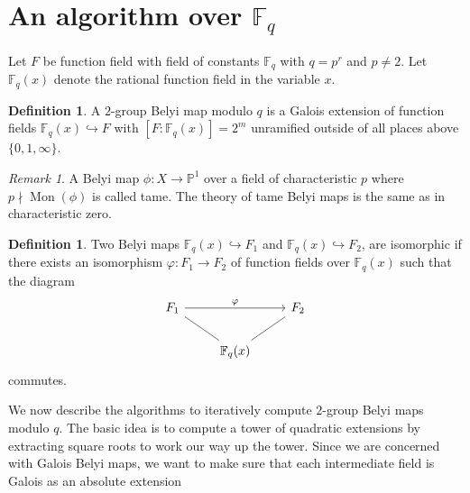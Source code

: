 \documentclass{dcthesis}
\newcommand{\PP}{\mathbb P}
\newcommand{\defi}[1]{\textsf{#1}}
\newcommand{\mm}[1]{{\color{blue} \sf MM: [#1]}}
\newcommand{\FF}{\mathbb{F}}
\DeclareMathOperator{\Mon}{Mon}
\numberwithin{equation}{section}
\theoremstyle{definition}
\newtheorem{definition}[equation]{Definition}
\theoremstyle{remark}
\newtheorem{remark}[equation]{Remark}
\begin{document}
{{  \section{An algorithm over $\FF_q$}{
    \label{sec:functionfieldalgorithm}
    Let $F$ be function field
    with field of constants
    $\FF_q$ with $q=p^r$ and $p\neq 2$.
    Let $\FF_q(x)$ denote the rational
    function field in the variable $x$.
    \begin{definition}
      \label{def:pgroupbelyimapmodq}
      A \defi{$2$-group Belyi map modulo $q$}
      is a Galois extension of
      function fields
      $\FF_q(x)\hookrightarrow F$ with
      $[F:\FF_q(x)]=2^m$
      unramified outside of
      all places above $\{0,1,\infty\}$.
    \end{definition}
    \begin{remark}
      \label{rmk:tamebelyi}
      A Belyi map
      $\phi\colon X\to\PP^1$ over a
      field of characteristic $p$
      where $p\nmid\Mon(\phi)$
      is called \defi{tame}.
      The theory of tame Belyi maps is
      the same as in characteristic zero.
    \end{remark}
    \begin{definition}\label{def:belyiisomodq}
      Two Belyi maps
      $\FF_q(x)\hookrightarrow F_1$ and
      $\FF_q(x)\hookrightarrow F_2$,
      are \defi{isomorphic}
      if there exists an isomorphism
      $\varphi\colon F_1\to F_2$
      of function fields over
      $\FF_q(x)$
      such that the diagram
      \begin{equation}
        \label{eqn:belyiisomodq}
        \begin{tikzcd}
          F_1\arrow{rr}{\varphi}
          \arrow[-]{dr}[swap]{}
          &
          &F_2\arrow[-]{dl}{}\\
          &\FF_q(x)
        \end{tikzcd}
      \end{equation}
      commutes.
    \end{definition}
    We now describe the algorithms
    to iteratively compute $2$-group Belyi maps
    modulo $q$.
    The basic idea is to compute a tower
    of quadratic extensions
    by extracting square roots
    to work our way up the tower.
    Since we are concerned with Galois
    Belyi maps,
    we want to make sure
    that each intermediate field
    is Galois as an absolute extension
}}}
\end{document}
